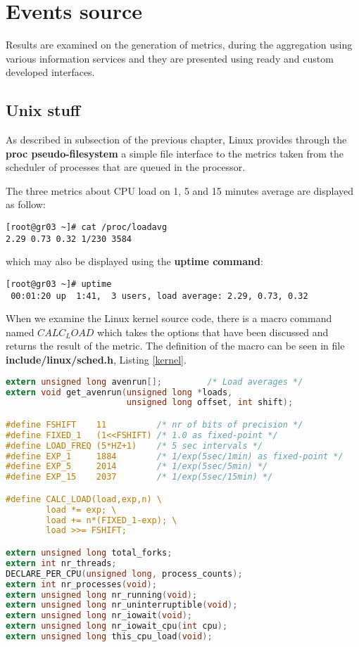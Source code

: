 
\section{Events source}

Results are examined on the generation of metrics, during the aggregation using various information services and they are presented using ready and custom developed interfaces.

\subsection{Unix stuff}

As described in subsection  of the previous chapter, Linux provides through the {\bf proc pseudo-filesystem} a simple file interface to the metrics taken from the scheduler of processes that are queued in the processor.

The three metrics about CPU load on 1, 5 and 15 minutes average are displayed as follow:

\begin{verbatim}
[root@gr03 ~]# cat /proc/loadavg 
2.29 0.73 0.32 1/230 3584
\end{verbatim}

which may also be displayed using the {\bf uptime command}:

\begin{lstlisting}
[root@gr03 ~]# uptime
 00:01:20 up  1:41,  3 users, load average: 2.29, 0.73, 0.32
\end{lstlisting}

When we examine the Linux kernel source code, there is a macro command named $CALC_LOAD$ which takes the options that have been discussed and returns the result of the metric. The definition of the macro can be seen in file {\bf include/linux/sched.h}, Listing \ref{kernel}.

\begin{lstlisting}[language=C,caption=Linux kernel CALC\_LOAD macro,label=kernel]
extern unsigned long avenrun[];         /* Load averages */
extern void get_avenrun(unsigned long *loads, 
                        unsigned long offset, int shift);

#define FSHIFT    11          /* nr of bits of precision */
#define FIXED_1   (1<<FSHIFT) /* 1.0 as fixed-point */
#define LOAD_FREQ (5*HZ+1)    /* 5 sec intervals */
#define EXP_1     1884        /* 1/exp(5sec/1min) as fixed-point */
#define EXP_5     2014        /* 1/exp(5sec/5min) */
#define EXP_15    2037        /* 1/exp(5sec/15min) */

#define CALC_LOAD(load,exp,n) \
        load *= exp; \
        load += n*(FIXED_1-exp); \
        load >>= FSHIFT;

extern unsigned long total_forks;
extern int nr_threads;
DECLARE_PER_CPU(unsigned long, process_counts);
extern int nr_processes(void);
extern unsigned long nr_running(void);
extern unsigned long nr_uninterruptible(void);
extern unsigned long nr_iowait(void);
extern unsigned long nr_iowait_cpu(int cpu);
extern unsigned long this_cpu_load(void);
\end{lstlisting}

